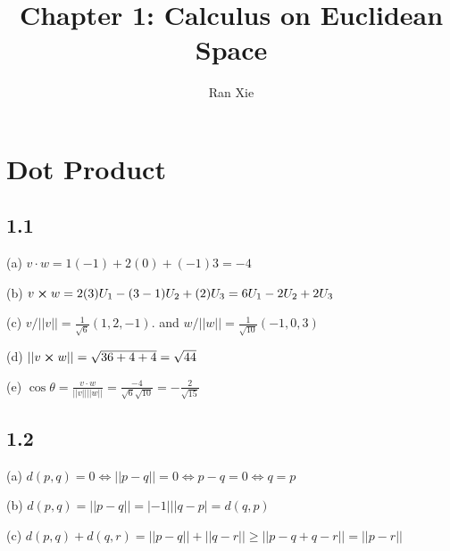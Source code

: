 \documentclass[12pt]{article}
\title{Chapter 1: Calculus on Euclidean Space}
\author{Ran Xie}
\begin{document}
\maketitle
\section{Dot Product}
\subsection*{1.1}
(a) $v \cdot w = 1(-1)+2(0)+(-1)3 = -4$

(b) $v \cross w = 2(3)U_1 - (3- 1)U_2 + (2)U_3 = 6U_1 - 2U_2 + 2U_3$

(c) $v/||v|| = \frac{1}{\sqrt{6}}(1, 2, -1)$.  and $w/||w|| = \frac{1}{\sqrt{10}}(-1, 0, 3)$

(d) $||v \cross w|| = \sqrt{36 + 4 + 4} = \sqrt{44}$

(e) $\cos \theta = \frac{v \cdot w}{||v||||w||} = \frac{-4}{\sqrt{6} \sqrt{10}} = - \frac{2}{\sqrt{15}}$

\subsection*{1.2}
(a) $d(p, q) = 0 \Leftrightarrow ||p-q|| = 0 \Leftrightarrow p - q = 0 \Leftrightarrow q = p$

(b) $d(p, q) = || p - q|| = |-1|||q - p| = d(q, p)$

(c) $d(p, q) + d(q, r) = ||p - q|| + ||q - r|| \geq ||p - q + q - r|| = ||p - r||$
\end{document}
